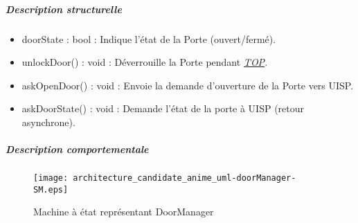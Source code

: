         \subparagraph{Description structurelle}%
            \begin{itemize}
                \item {doorState : bool : Indique l'état de la Porte (ouvert/fermé).}
            \end{itemize}
            \begin{itemize}
                \item {unlockDoor() : void : Déverrouille la Porte pendant \hyperlink{top}{\textit{TOP}}.}
                \item {askOpenDoor() : void : Envoie la demande d'ouverture de la Porte vers UISP.}
                \item {askDoorState() : void : Demande l'état de la porte à UISP (retour asynchrone).}
            \end{itemize}
        \subparagraph{Description comportementale}%
        \begin{figure} [H]
            \centering
            \texttt{[image: architecture\_candidate\_anime\_uml-doorManager-SM.eps]}
            \caption{Machine à état représentant DoorManager}
            \label{MaE_DoorManager}
        \end{figure}

\newpage

